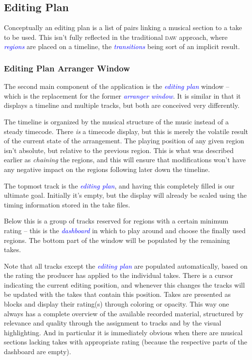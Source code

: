 \documentclass[11pt,a4paper]{article}
\newcommand*{\term}[1]{\textcolor{blue}{\emph{#1}}}
\begin{document}
\subsection{Editing Plan}
Conceptually an editing plan is a list of pairs linking a musical section to
a take to be used. This isn't fully reflected in the traditional \textsc{daw}
approach, where \term{regions} are placed on a timeline,
the \term{transitions} being sort of an implicit result.


\subsubsection{Editing Plan Arranger Window}
The second main component of the application is the \term{editing plan} window
-- which is the replacement for the former \term{arranger window}.
It is similar in that it displays a timeline and multiple tracks, but both are
conceived very differently.

The timeline is organized by the musical structure of the music instead of a
steady timecode.
There \emph{is} a timecode display, but this is merely the volatile result of
the current state of the arrangement.
The playing position of any given region isn't absolute, but relative to the
previous region.
This is what was described earlier as \emph{chaining} the regions, and this will
ensure that modifications won't have any negative impact on the regions following
later down the timeline.

The topmost track is the \term{editing plan}, and having this completely filled
is our ultimate goal.
Initially it's empty, but the display will already be scaled using the timing
information stored in the take files.

Below this is a group of tracks reserved for regions with a certain minimum
rating -- this is the \term{dashboard} in which to play around and choose the finally
used regions.
The bottom part of the window will be populated by the remaining takes.

Note that all tracks except the \term{editing plan} are populated automatically, based
on the rating the producer has applied to the individual takes.
There is a cursor indicating the current editing position, and
whenever this changes the tracks will be updated with the takes that contain
this position.
Takes are presented as blocks and display their rating(s) through coloring or opacity.
This way one always has a complete overview of the available recorded material,
structured by relevance and quality through the assignment to tracks and by the
visual highlighting.
And in particular it is immediately obvious when there are musical sections lacking
takes with appropriate rating (because the respective parts of the
dashboard are empty).
\end{document}
